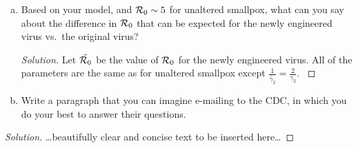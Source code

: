\documentclass[12pt]{article}\usepackage[]{graphicx}\usepackage[]{color}
\begin{document}
\begin{enumerate}[(a)]
{\begin{proof}[Solution]
{$\R_0$ is the spectral radius - i.e. the maximum eigenvalue - of this matrix. Using Mathematica to compute this:
\begin{align}
  \R_0 &= \rho (FV^{-1}) \\
  &= \frac{\sigma}{(\sigma + \mu)(\gamma_1+\mu)(\gamma_2+\mu)} \left ( \beta_1(\gamma_2+\mu) + \frac{\beta_2\gamma_1(\gamma_3+\mu)}{\gamma_3+\mu}
+ \frac{\beta_3\gamma_1\gamma_2(\gamma_4+\mu)}{(\gamma_3+\mu)(\gamma_4+\mu)}
+ \frac{\beta_4\gamma_1\gamma_2\gamma_3}{(\gamma_3+\mu)(\gamma_4+\mu)}
  \right ) \\
  &= \frac{\sigma}{(\sigma + \mu)(\gamma_1+\mu)(\gamma_2+\mu)(\gamma_3+\mu)(\gamma_4+\mu)} ( \beta_1(\gamma_2+\mu)(\gamma_3+\mu)(\gamma_4+\mu) \nonumber \\
  & + \beta_2\gamma_1(\gamma_3+\mu)(\gamma_4+\mu) +\beta_3\gamma_1\gamma_2(\gamma_4+\mu) +\beta_4\gamma_1\gamma_2\gamma_3
   )
\end{align}


}
\end{proof}
}

  \item Based on your model, and ${\cal R}_0\sim5$ for unaltered smallpox, what can you say about the difference in $\R_0$ that can be expected for the newly engineered virus vs.\ the original virus?  

{\color{blue}
\begin{proof}[Solution]
{\color{magenta}
Let $\tilde{{\cal R}_0}$ be the value of $\R_0$ for the newly engineered virus. All of the parameters are the same as for unaltered smallpox except $\frac{1}{\tilde{\gamma_2}}=\frac{2}{\gamma_2}$. 
}
\end{proof}
}

\item Write a paragraph that you can imagine e-mailing to the CDC, in which you do your best to answer their questions.
\end{enumerate}

{\color{blue}
\begin{proof}[Solution]
{\color{magenta}\dots beautifully clear and concise text to be inserted here\dots}
\end{proof}
}
\end{document}
